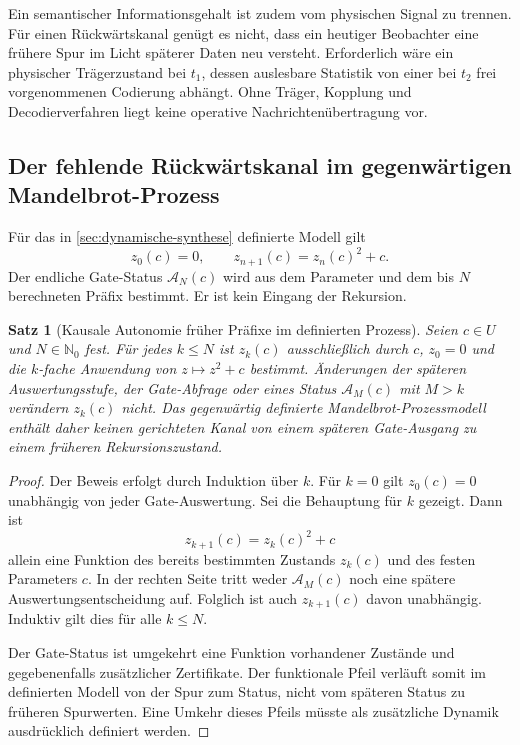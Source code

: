 \documentclass[11pt,a4paper]{article}
\newtheorem{satz}{Satz}[section]
\theoremstyle{remark}
\newcommand{\N}{\mathbb{N}}
\begin{document}
Ein semantischer Informationsgehalt ist zudem vom physischen Signal zu
trennen. Für einen Rückwärtskanal genügt es nicht, dass ein heutiger Beobachter
eine frühere Spur im Licht späterer Daten neu versteht. Erforderlich wäre ein
physischer Trägerzustand bei \(t_1\), dessen auslesbare Statistik von einer bei
\(t_2\) frei vorgenommenen Codierung abhängt. Ohne Träger, Kopplung und
Decodierverfahren liegt keine operative Nachrichtenübertragung vor.

\subsection{Der fehlende Rückwärtskanal im gegenwärtigen Mandelbrot-Prozess}

Für das in \cref{sec:dynamische-synthese} definierte Modell gilt
\[
  z_0(c)=0,
  \qquad
  z_{n+1}(c)=z_n(c)^2+c.
\]
Der endliche Gate-Status \(\mathcal A_N(c)\) wird aus dem Parameter und dem
bis \(N\) berechneten Präfix bestimmt. Er ist kein Eingang der Rekursion.

\begin{satz}[Kausale Autonomie früher Präfixe im definierten Prozess]
\label{satz:kein-rueckwaertskanal}
Seien \(c\in U\) und \(N\in\N_0\) fest. Für jedes \(k\le N\) ist
\(z_k(c)\) ausschließlich durch \(c\), \(z_0=0\) und die \(k\)-fache
Anwendung von \(z\mapsto z^2+c\) bestimmt. Änderungen der späteren
Auswertungsstufe, der Gate-Abfrage oder eines Status
\(\mathcal A_M(c)\) mit \(M>k\) verändern \(z_k(c)\) nicht. Das gegenwärtig
definierte Mandelbrot-Prozessmodell enthält daher keinen gerichteten Kanal von
einem späteren Gate-Ausgang zu einem früheren Rekursionszustand.
\end{satz}

\begin{proof}
Der Beweis erfolgt durch Induktion über \(k\). Für \(k=0\) gilt
\(z_0(c)=0\) unabhängig von jeder Gate-Auswertung. Sei die Behauptung für
\(k\) gezeigt. Dann ist
\[
  z_{k+1}(c)=z_k(c)^2+c
\]
allein eine Funktion des bereits bestimmten Zustands \(z_k(c)\) und des
festen Parameters \(c\). In der rechten Seite tritt weder
\(\mathcal A_M(c)\) noch eine spätere Auswertungsentscheidung auf. Folglich
ist auch \(z_{k+1}(c)\) davon unabhängig. Induktiv gilt dies für alle
\(k\le N\).

Der Gate-Status ist umgekehrt eine Funktion vorhandener Zustände und
gegebenenfalls zusätzlicher Zertifikate. Der funktionale Pfeil verläuft somit
im definierten Modell von der Spur zum Status, nicht vom späteren Status zu
früheren Spurwerten. Eine Umkehr dieses Pfeils müsste als zusätzliche
Dynamik ausdrücklich definiert werden.
\end{proof}
\end{document}
